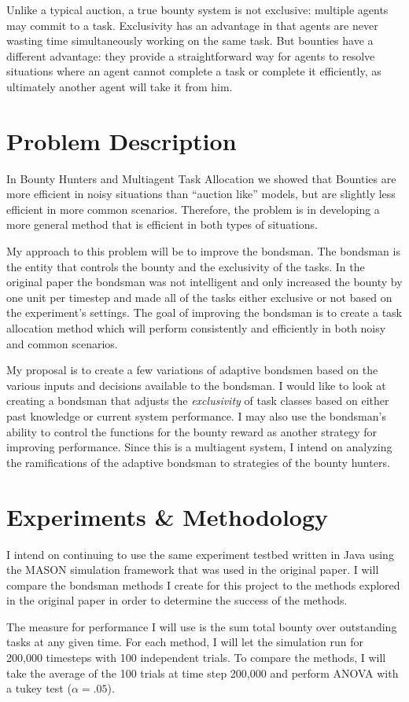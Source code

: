 \documentclass[twocolumn]{article}
\begin{document}
Unlike a typical auction, a true bounty system is not exclusive: multiple agents may commit to a task.  Exclusivity has an advantage in that agents are never wasting time simultaneously working on the same task.  But bounties have a different advantage: they provide a straightforward way for agents to resolve situations where an agent cannot complete a task or complete it efficiently, as ultimately another agent will take it from him. 

\section{Problem Description}
In Bounty Hunters and Multiagent Task Allocation we showed that Bounties are more efficient in noisy situations than ``auction like'' models, but are slightly less efficient in more common scenarios.  Therefore, the problem is in developing a more general method that is efficient in both types of situations.  

My approach to this problem will be to improve the bondsman.  The bondsman is the entity that controls the bounty and the exclusivity of the tasks.  In the original paper the bondsman was not intelligent and only increased the bounty by one unit per timestep and made all of the tasks either exclusive or not based on the experiment's settings.  The goal of improving the bondsman is to create a task allocation method which will perform consistently and efficiently in both noisy and common scenarios.

My proposal is to create a few variations of adaptive bondsmen based on the various inputs and decisions available to the bondsman.  I would like to look at creating a bondsman that adjusts the {\it exclusivity} of task classes based on either past knowledge or current system performance.  I may also use the bondsman's ability to control the functions for the bounty reward as another strategy for improving performance.  Since this is a multiagent system, I intend on analyzing the ramifications of the adaptive bondsman to strategies of the bounty hunters.

\section{Experiments \& Methodology}
I intend on continuing to use the same experiment testbed written in Java using the MASON simulation framework that was used in the original paper.  I will compare the bondsman methods I create for this project to the methods explored in the original paper in order to determine the success of the methods.

The measure for performance I will use is the sum total bounty over outstanding tasks at any given time.  For each method, I will let the simulation run for 200,000 timesteps with 100 independent trials.  To compare the methods, I will take the average of the 100 trials at time step 200,000 and perform ANOVA with a tukey test (\(\alpha = .05\)).

\vspace{-0.5em}


\end{document}
